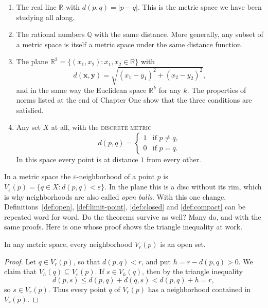 \begin{enumerate}
	\item The real line $\mathbb{R}$ with $d(p,q) = |p - q|$.  This is the metric space we have been studying all along.
	\item The rational numbers $\mathbb{Q}$ with the same distance.  More generally, any subset of a metric space is itself a metric space under the same distance function.
	\item The plane $\mathbb{R}^2 = \{(x_1, x_2) : x_1, x_2 \in \mathbb{R}\}$ with
	\[ d(\mathbf{x}, \mathbf{y}) = \sqrt{(x_1 - y_1)^2 + (x_2 - y_2)^2}, \]
	and in the same way the Euclidean space $\mathbb{R}^k$ for any $k$.  The properties of norms listed at the end of Chapter One show that the three conditions are satisfied.
	\item Any set $X$ at all, with the \textsc{discrete metric}
	\begin{displaymath}
	   d(p,q) = \left\{
	     \begin{array}{ll}
	       1 & \text{if } p \neq q, \\
	       0 & \text{if } p = q.
	     \end{array}
	   \right.
	\end{displaymath}
	In this space every point is at distance $1$ from every other.
\end{enumerate}

In a metric space the $\varepsilon$-neighborhood of a point $p$ is $V_{\varepsilon}(p) = \{q \in X : d(p,q) < \varepsilon\}$.  In the plane this is a disc without its rim, which is why neighborhoods are also called \emph{open balls}.  With this one change, Definitions~\ref{def:open}, \ref{def:limit-point}, \ref{def:closed} and \ref{def:compact} can be repeated word for word.  Do the theorems survive as well?  Many do, and with the same proofs.  Here is one whose proof shows the triangle inequality at work.

\begin{theorem}
In any metric space, every neighborhood $V_r(p)$ is an open set.
\end{theorem}

\begin{proof}
Let $q \in V_r(p)$, so that $d(p,q) < r$, and put $h = r - d(p,q) > 0$.  We claim that $V_h(q) \subseteq V_r(p)$.  If $s \in V_h(q)$, then by the triangle inequality
\[ d(p,s) \leq d(p,q) + d(q,s) < d(p,q) + h = r, \]
so $s \in V_r(p)$.  Thus every point $q$ of $V_r(p)$ has a neighborhood contained in $V_r(p)$.
\end{proof}

